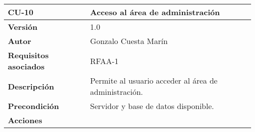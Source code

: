 \begin{longtable}[]{@{}ll@{}}
\toprule
\begin{minipage}[b]{0.20\columnwidth}\raggedright
\textbf{CU-10}\strut
\end{minipage} & \begin{minipage}[b]{0.74\columnwidth}\raggedright
\textbf{Acceso al área de administración}\strut
\end{minipage}\tabularnewline
\midrule
\endhead
\begin{minipage}[t]{0.20\columnwidth}\raggedright
\textbf{Versión}\strut
\end{minipage} & \begin{minipage}[t]{0.74\columnwidth}\raggedright
1.0\strut
\end{minipage}\tabularnewline
\begin{minipage}[t]{0.20\columnwidth}\raggedright
\textbf{Autor}\strut
\end{minipage} & \begin{minipage}[t]{0.74\columnwidth}\raggedright
Gonzalo Cuesta Marín\strut
\end{minipage}\tabularnewline
\begin{minipage}[t]{0.20\columnwidth}\raggedright
\textbf{Requisitos asociados}\strut
\end{minipage} & \begin{minipage}[t]{0.74\columnwidth}\raggedright
RFAA-1\strut
\end{minipage}\tabularnewline
\begin{minipage}[t]{0.20\columnwidth}\raggedright
\textbf{Descripción}\strut
\end{minipage} & \begin{minipage}[t]{0.74\columnwidth}\raggedright
Permite al usuario acceder al área de administración.\strut
\end{minipage}\tabularnewline
\begin{minipage}[t]{0.20\columnwidth}\raggedright
\textbf{Precondición}\strut
\end{minipage} & \begin{minipage}[t]{0.74\columnwidth}\raggedright
Servidor y base de datos disponible.\strut
\end{minipage}\tabularnewline
\begin{minipage}[t]{0.20\columnwidth}\raggedright
\textbf{Acciones}\strut
\end{minipage} & \begin{minipage}[t]{0.74\columnwidth}\raggedright
\begin{enumerate}

\end{enumerate}
\end{minipage}
\end{longtable}
